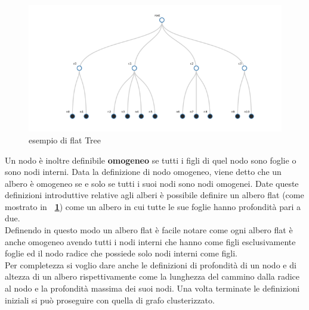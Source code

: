 \begin{figure}[!htb]
	\begin{center}
		\includegraphics[width=0.8 \linewidth]{figure/flatTree}
	\end{center}
	\caption{esempio di flat Tree \label{fig:flatTree}}
\end{figure}
Un nodo è inoltre definibile \textbf{omogeneo} se tutti i figli di quel nodo sono foglie o sono nodi interni.
Data la definizione di nodo omogeneo, viene detto che un albero è omogeneo se e solo se tutti i suoi nodi sono nodi omogenei.
Date queste definizioni introduttive relative agli alberi è possibile definire un albero flat (come mostrato in \textbf{\figurename~\ref{fig:flatTree}}) come un albero in cui tutte le sue foglie hanno profondità pari a due.\\
Definendo in questo modo un albero flat è facile notare come ogni albero flat è anche omogeneo avendo tutti i nodi interni che hanno come figli esclusivamente foglie ed il nodo radice che possiede solo nodi interni come figli.\\
Per completezza si voglio dare anche le definizioni di profondità di un nodo e di altezza di un albero rispettivamente come la lunghezza del cammino dalla radice al nodo e la profondità massima dei suoi nodi.
Una volta terminate le definizioni iniziali si può proseguire con quella di grafo clusterizzato.
